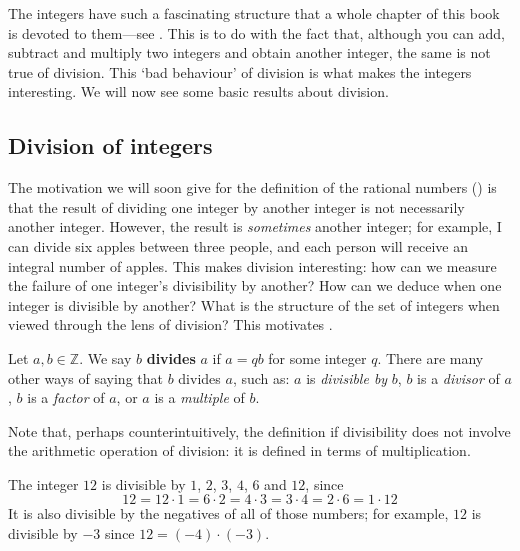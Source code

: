 The integers have such a fascinating structure that a whole chapter of this book is devoted to them---see . This is to do with the fact that, although you can add, subtract and multiply two integers and obtain another integer, the same is not true of division. This `bad behaviour' of division is what makes the integers interesting. We will now see some basic results about division.

\subsection*{Division of integers}
\label{pGettingStartedDivision}

The motivation we will soon give for the definition of the rational numbers () is that the result of dividing one integer by another integer is not necessarily another integer. However, the result is \textit{sometimes} another integer; for example, I can divide six apples between three people, and each person will receive an integral number of apples. This makes division interesting: how can we measure the failure of one integer's divisibility by another? How can we deduce when one integer is divisible by another? What is the structure of the set of integers when viewed through the lens of division? This motivates .

\begin{definition}
\label{defDivisionPreliminary}
Let $a,b \in \mathbb{Z}$. We say $b$ \textbf{divides} $a$ if $a=qb$ for some integer $q$. There are many other ways of saying that $b$ divides $a$, such as: $a$ is \textit{divisible by} $b$, $b$ is a \textit{divisor} of $a$, $b$ is a \textit{factor} of $a$, or $a$ is a \textit{multiple} of $b$.
\end{definition}

Note that, perhaps counterintuitively, the definition if divisibility does not involve the arithmetic operation of division: it is defined in terms of multiplication.

\begin{example}
The integer $12$ is divisible by $1$, $2$, $3$, $4$, $6$ and $12$, since
\[ 12 = 12 \cdot 1 = 6 \cdot 2 = 4 \cdot 3 = 3 \cdot 4 = 2 \cdot 6 = 1 \cdot 12 \]
It is also divisible by the negatives of all of those numbers; for example, $12$ is divisible by $-3$ since $12 = (-4) \cdot (-3)$.
\end{example}

